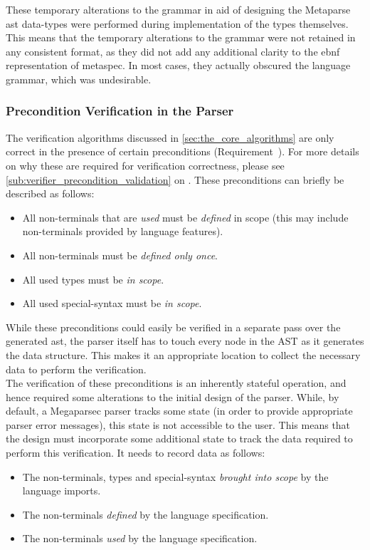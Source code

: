 These temporary alterations to the grammar in aid of designing the Metaparse \gls{ast} data-types were performed during implementation of the types themselves.
This means that the temporary alterations to the grammar were not retained in any consistent format, as they did not add any additional clarity to the \gls{ebnf} representation of \gls{metaspec}.
In most cases, they actually obscured the language grammar, which was undesirable.


\subsubsection{Precondition Verification in the Parser} %
\label{ssub:precondition_verification_in_the_parser}
The verification algorithms discussed in \autoref{sec:the_core_algorithms} are only correct in the presence of certain preconditions (Requirement~).
For more details on why these are required for verification correctness, please see \autoref{sub:verifier_precondition_validation} on .
These preconditions can briefly be described as follows:
\begin{itemize}
    \item All non-terminals that are \textit{used} must be \textit{defined} in scope (this may include non-terminals provided by language features).
    \item All non-terminals must be \textit{defined only once}.
    \item All used types must be \textit{in scope}.
    \item All used special-syntax must be \textit{in scope}. 
\end{itemize}

While these preconditions could easily be verified in a separate pass over the generated \gls{ast}, the parser itself has to touch every node in the AST as it generates the data structure.
This makes it an appropriate location to collect the necessary data to perform the verification.\\

The verification of these preconditions is an inherently stateful operation, and hence required some alterations to the initial design of the parser.
While, by default, a Megaparsec parser tracks some state (in order to provide appropriate parser error messages), this state is not accessible to the user. 
This means that the design must incorporate some additional state to track the data required to perform this verification.
It needs to record data as follows:
\begin{itemize}
    \item The non-terminals, types and special-syntax \textit{brought into scope} by the language imports.
    \item The non-terminals \textit{defined} by the language specification.
    \item The non-terminals \textit{used} by the language specification. 
\end{itemize}

